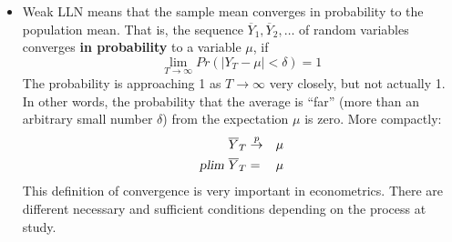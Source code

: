 \documentclass[a4paper]{scrartcl}
\begin{document}
\begin{enumerate}
\begin{solution}
\begin{itemize}
			\item Weak LLN means that the sample mean converges in probability to the population mean. That is, the sequence $\overline{Y}_{1},\overline{Y}_{2},\ldots $ of random variables converges \textbf{in probability} to a variable $\mu$, if
			\begin{equation*}
			\lim_{T\rightarrow \infty }Pr\left( |Y_{T}-\mu|<\delta \right) =1
			\end{equation*}
			The probability is approaching 1 as $T\rightarrow \infty$ very closely, but not actually 1. In other words, the probability that the average is \enquote{far} (more than an arbitrary small number $\delta$) from the expectation $\mu$ is zero. More compactly:
			\begin{eqnarray*}
				\overline{Y}_{T} &\overset{p}{\rightarrow }&\mu \\
				\textsl{plim}~\overline{Y}_{T} &=&\mu
			\end{eqnarray*}
			This definition of convergence is very important in econometrics. There are different necessary and sufficient conditions depending on the process at study.
		\end{itemize}		


\end{solution}
\end{enumerate}
\end{document}
